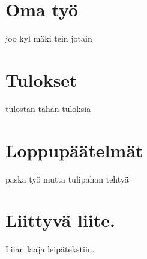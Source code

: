 \documentclass[12pt,a4paper]{article}
\begin{document}

\section{Oma työ}
joo kyl mäki tein jotain


\section{Tulokset}
tulostan tähän tuloksia


\section{Loppupäätelmät}
paska työ mutta tulipahan tehtyä





\appendix
\newpage
\section{Liittyvä liite.} \label{koodi}
Liian laaja leipätekstiin.
\end{document}
